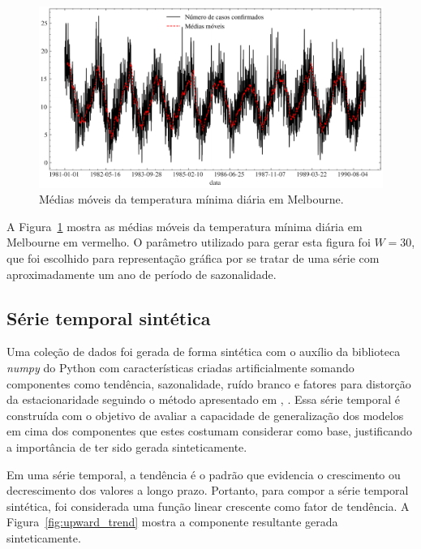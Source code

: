 \begin{figure}[!htp]
    \centering
    \includegraphics[width=5.0in]{img/temperatura_minima_diaria_ma.pdf}
    \caption{Médias móveis da temperatura mínima diária em Melbourne.}\label{fig:temperatura_minima_diaria_ma}
\end{figure}

A Figura~\ref{fig:temperatura_minima_diaria_ma} mostra as médias móveis da temperatura mínima diária em Melbourne em vermelho. O parâmetro utilizado para gerar esta figura foi $W=30$, que foi escolhido para representação gráfica por se tratar de uma série com aproximadamente um ano de período de sazonalidade.

\FloatBarrier

\subsection{Série temporal sintética}
Uma coleção de dados foi gerada de forma sintética com o auxílio da biblioteca \textit{numpy} do Python com características criadas artificialmente somando componentes como tendência, sazonalidade, ruído branco e fatores para distorção da estacionaridade seguindo o método apresentado em \citeauthor{syntheticdata}, \citeyear{syntheticdata}\cite{syntheticdata}. Essa série temporal é construída com o objetivo de avaliar a capacidade de generalização dos modelos em cima dos componentes que estes costumam considerar como base, justificando a importância de ter sido gerada sinteticamente.

Em uma série temporal, a tendência é o padrão que evidencia o crescimento ou decrescimento dos valores a longo prazo. Portanto, para compor a série temporal sintética, foi considerada uma função linear crescente como fator de tendência. A Figura~\ref{fig:upward_trend} mostra a componente resultante gerada sinteticamente.

